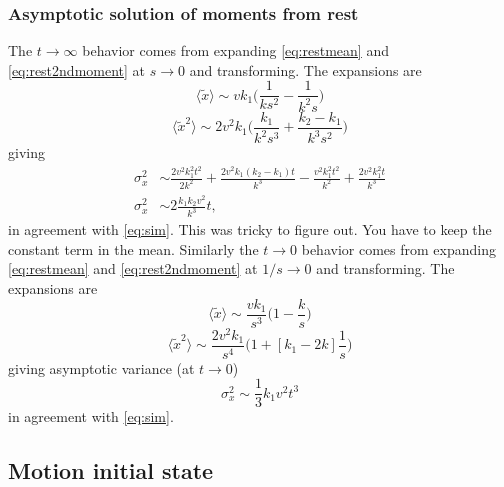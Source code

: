 \documentclass[11pt]{article}
\newcommand\be{\begin{equation}} %
\newcommand\ee{\end{equation}}   %
\newcommand\bra{\langle}
\newcommand\ket{\rangle}
\begin{document}
\subsubsection{Asymptotic solution of moments from rest}
The $t\rightarrow \infty$ behavior comes from expanding \ref{eq:restmean} and \ref{eq:rest2ndmoment} at $s\rightarrow0$ and transforming. 
The expansions are 
\be \bra \tilde{x} \ket \sim vk_1 \Big( \frac{1}{ks^2} - \frac{1}{k^2 s}\Big)\ee
\be \bra \tilde{x}^2 \ket \sim 2v^2k_1\Big(\frac{k_1}{k^2s^3} + \frac{k_2-k_1}{k^3s^2}\Big)\ee
giving 
\begin{align} \sigma_x^2 &\sim  \frac{2v^2k_1^2 t^2}{2k^2} + \frac{2v^2k_1(k_2-k_1)t}{k^3}  - \frac{v^2k_1^2 t^2}{k^2} + \frac{2v^2k_1^2t}{k^3} \\ \sigma_x^2&\sim 2\frac{k_1k_2 v^2}{k^3} t,\end{align}
in agreement with \ref{eq:sim}. This was tricky to figure out. You have to keep the constant term in the mean.
Similarly the $t\rightarrow 0$ behavior comes from expanding  \ref{eq:restmean} and \ref{eq:rest2ndmoment} at $1/s\rightarrow0$ and transforming.
The expansions are 
\be \bra \tilde{x} \ket \sim  \frac{vk_1}{s^3}\Big(1-\frac{k}{s}\Big)\ee
\be \bra \tilde{x}^2 \ket \sim \frac{2v^2k_1}{s^4}\Big(1+ [k_1-2k]\frac{1}{s}\Big)\ee
giving asymptotic variance (at $t\rightarrow 0$)
\be \sigma_x^2 \sim \frac{1}{3}k_1v^2 t^3 \ee
in agreement with  \ref{eq:sim}.
\subsection{Motion initial state}
\end{document}
